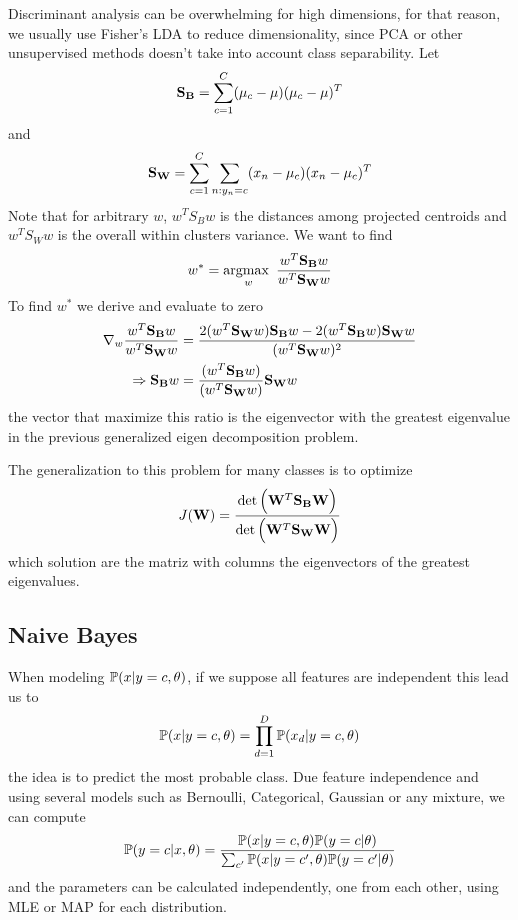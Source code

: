 \documentclass[../main.tex]{subfiles}
\begin{document}
Discriminant analysis can be overwhelming for high dimensions, for that reason, we usually use Fisher's LDA to reduce dimensionality, since PCA or other unsupervised methods doesn't take into account class separability. Let
\begin{equation*}
    \mathbf{S_B} = \sum_{c=1}^C (\mu_c - \mu)(\mu_c - \mu)^T
\end{equation*}
and
\begin{equation*}
    \mathbf{S_W} = \sum_{c=1}^C \sum_{n:y_n=c} (x_n - \mu_c)(x_n - \mu_c)^T
\end{equation*}
Note that for arbitrary $w$, $w^T S_B w$ is the distances among projected centroids and $w^T S_W w$ is the overall within clusters variance. We want to find 
\begin{equation*}
    w^* = \operatorname*{argmax\text{ }}_w\dfrac{w^T \mathbf{S_B} w}{w^T \mathbf{S_W} w}
\end{equation*}
To find $w^*$ we derive and evaluate to zero
\begin{align*}
    \nabla_w \dfrac{w^T \mathbf{S_B} w}{w^T \mathbf{S_W} w}
    &= \dfrac{2(w^T \mathbf{S_W} w)\mathbf{S_B} w -2(w^T \mathbf{S_B} w) \mathbf{S_W} w}{(w^T \mathbf{S_W} w)^2}\\
    \Rightarrow \mathbf{S_B} w 
    &= \dfrac{(w^T \mathbf{S_B} w)}{(w^T \mathbf{S_W} w)} \mathbf{S_W} w
\end{align*}
the vector that maximize this ratio is the eigenvector with the greatest eigenvalue in the previous generalized eigen decomposition problem.

The generalization to this problem for many classes is to optimize
\begin{equation*}
    J(\mathbf{W}) = \dfrac{\det\Big( \mathbf{W}^T \mathbf{S_B} \mathbf{W} \Big)}{\det\Big( \mathbf{W}^T \mathbf{S_W} \mathbf{W} \Big)}
\end{equation*}
which solution are the matriz with columns the eigenvectors of the greatest eigenvalues.

\subsection{Naive Bayes}
When modeling $\mathbb{P}(x|y=c,\theta)$, if we suppose all features are independent this lead us to 
\begin{equation*}
    \mathbb{P}(x|y=c,\theta) = \prod_{d=1}^D \mathbb{P}(x_d|y=c,\theta)
\end{equation*}
the idea is to predict the most probable class. Due feature independence and using several models such as Bernoulli, Categorical, Gaussian or any mixture, we can compute 
\begin{equation*}
    \mathbb{P}(y=c|x,\theta) = \dfrac{\mathbb{P}(x|y=c,\theta)\mathbb{P}(y=c|\theta)}{\sum_{c'}\mathbb{P}(x|y=c',\theta)\mathbb{P}(y=c'|\theta)}
\end{equation*}
and the parameters can be calculated independently, one from each other, using MLE or MAP for each distribution.    
\end{document}
